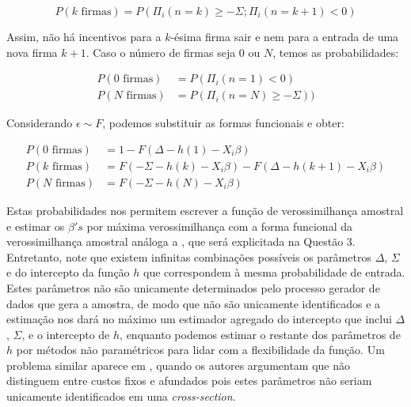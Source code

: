 \documentclass{article}
\begin{document}
\begin{equation}
    P(k \text{ firmas}) = P(\Pi_i(n=k) \geq -\Sigma ; \Pi_i(n=k+1) < 0)
\end{equation}

Assim, não há incentivos para a $k$-ésima firma sair e nem para a entrada de uma nova firma $k+1$. Caso o número de firmas seja 0 ou $N$, temos as probabilidades:

\begin{equation*}
    \begin{aligned}
     P (0 \text{ firmas})&= P(\Pi_i(n=1) < 0)  \\
     P (N \text{ firmas})&= P(\Pi_i(n=N) \geq -\Sigma))
    \end{aligned}
\end{equation*}

Considerando $\epsilon \sim F$, podemos substituir as formas funcionais e obter:

\begin{equation*}
    \begin{aligned}
        P (0 \text{ firmas})&=1 - F(\Delta - h(1) - X_i\beta)\\
        P(k \text{ firmas}) &=F(-\Sigma - h(k) - X_i\beta) - F(\Delta - h(k+1) - X_i\beta)\\
        P(N \text{ firmas}) &= F(-\Sigma - h(N) - X_i\beta)
    \end{aligned}
\end{equation*}

Estas probabilidades nos permitem escrever a função de verossimilhança amostral e estimar os $\beta's$ por máxima verossimilhança com a forma funcional da verossimilhança amostral análoga a , que será explicitada na Questão 3. Entretanto, note que existem infinitas combinações possíveis os parâmetros $\Delta$, $\Sigma$ e do intercepto da função $h$ que correspondem à mesma probabilidade de entrada. Estes parâmetros não são unicamente determinados pelo processo gerador de dados que gera a amostra, de modo que não são unicamente identificados e a estimação nos dará no máximo um estimador agregado do intercepto que inclui $\Delta$, $\Sigma$, e o intercepto de $h$, enquanto podemos estimar o restante dos parâmetros de $h$ por métodos não paramétricos para lidar com a flexibilidade da função. Um problema similar aparece em , quando os autores argumentam que não distinguem entre custos fixos e afundados pois estes parâmetros não seriam unicamente identificados em uma \emph{cross-section}.
\end{document}
